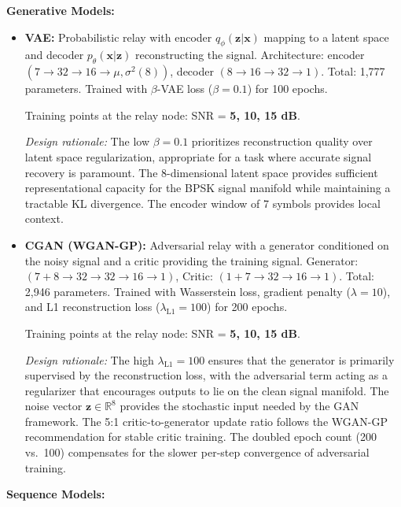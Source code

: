 \textbf{Generative Models:}

\begin{itemize}
\item
  \textbf{VAE:} Probabilistic relay with encoder \(q_\phi(\mathbf{z}|\mathbf{x})\) mapping to a latent space and decoder \(p_\theta(\mathbf{x}|\mathbf{z})\) reconstructing the signal. Architecture: encoder \((7 \to 32 \to 16 \to \mu, \sigma^2(8))\), decoder \((8 \to 16 \to 32 \to 1)\). Total: 1,777 parameters. Trained with \(\beta\)-VAE loss (\(\beta=0.1\)) for 100 epochs.

  Training points at the relay node: SNR = \textbf{5, 10, 15 dB}.

  \emph{Design rationale:} The low \(\beta = 0.1\) prioritizes reconstruction quality over latent space regularization, appropriate for a task where accurate signal recovery is paramount. The 8-dimensional latent space provides sufficient representational capacity for the BPSK signal manifold while maintaining a tractable KL divergence. The encoder window of 7 symbols provides local context.
\item
  \textbf{CGAN (WGAN-GP):} Adversarial relay with a generator conditioned on the noisy signal and a critic providing the training signal. Generator: \((7+8 \to 32 \to 32 \to 16 \to 1)\), Critic: \((1+7 \to 32 \to 16 \to 1)\). Total: 2,946 parameters. Trained with Wasserstein loss, gradient penalty (\(\lambda=10\)), and L1 reconstruction loss (\(\lambda_{\text{L1}}=100\)) for 200 epochs.

  Training points at the relay node: SNR = \textbf{5, 10, 15 dB}.

  \emph{Design rationale:} The high \(\lambda_{\text{L1}} = 100\) ensures that the generator is primarily supervised by the reconstruction loss, with the adversarial term acting as a regularizer that encourages outputs to lie on the clean signal manifold. The noise vector \(\mathbf{z} \in \mathbb{R}^8\) provides the stochastic input needed by the GAN framework. The 5:1 critic-to-generator update ratio follows the WGAN-GP recommendation for stable critic training. The doubled epoch count (200 vs.~100) compensates for the slower per-step convergence of adversarial training.
\end{itemize}

\textbf{Sequence Models:}

